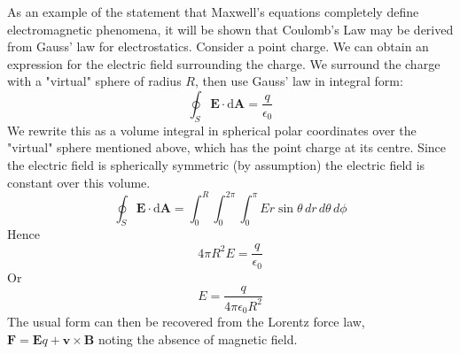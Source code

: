 \documentclass[12pt]{article}
\begin{document}
As an example of the statement that Maxwell's equations completely define electromagnetic phenomena, it will be shown that Coulomb's Law may be derived from Gauss' law for electrostatics. Consider a point charge. We can obtain an expression for the electric field surrounding the charge. We surround the charge with a "virtual" sphere of radius $R$, then use Gauss' law in integral form:
\[
\oint_S  \mathbf{E} \cdot \mathrm{d}\mathbf{A} = \frac {q}{\epsilon_0}
\]
We rewrite this as a volume integral  in spherical polar coordinates over the "virtual" sphere mentioned above, which has the point charge at its centre. Since the electric field is spherically symmetric (by assumption) the electric field is constant over this volume.
\[
\oint_S  \mathbf{E} \cdot \mathrm{d}\mathbf{A} = \int^R_0 \int^{2\pi}_0 \int^\pi_0 E r \sin \theta \,dr \,d\theta \,d\phi 
\]
Hence
\[
4\pi R^2 E = \frac{q}{\epsilon_0}
\]
Or
\[
E = \frac{q}{4\pi\epsilon_0 R^2}
\]
The usual form can then be recovered from the Lorentz force law, $\mathbf{F} = \mathbf{E}q + \mathbf{v} \times \mathbf{B}$ noting the absence of magnetic field.
\end{document}
